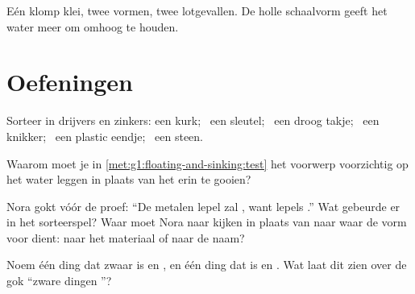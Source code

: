 \begin{omfigure}

{\small Eén klomp klei, twee vormen, twee lotgevallen. De holle
schaalvorm geeft het water meer om omhoog te houden.}
\end{omfigure}

\section{Oefeningen}

\begin{exercise}[$\star$]\label{exo:g1:floating-and-sinking:1}
Sorteer in drijvers en zinkers: een kurk; \ een sleutel; \ een droog
takje; \ een knikker; \ een plastic eendje; \ een steen.
\end{exercise}

\begin{exercise}[$\star$]\label{exo:g1:floating-and-sinking:2}
Waarom moet je in \cref{met:g1:floating-and-sinking:test} het voorwerp
voorzichtig op het water leggen in plaats van het erin te gooien?
\end{exercise}

\begin{exercise}[$\star$]\label{exo:g1:floating-and-sinking:3}
Nora gokt vóór de proef: ``De metalen lepel zal , want lepels
.'' Wat gebeurde er in het sorteerspel? Waar moet Nora naar
kijken in plaats van naar waar de vorm voor dient: naar het materiaal
of naar de naam?
\end{exercise}

\begin{exercise}[$\star$]\label{exo:g1:floating-and-sinking:4}
Noem één ding dat zwaar is en , en één ding dat  is en
. Wat laat dit zien over de gok ``zware dingen
''?
\end{exercise}

